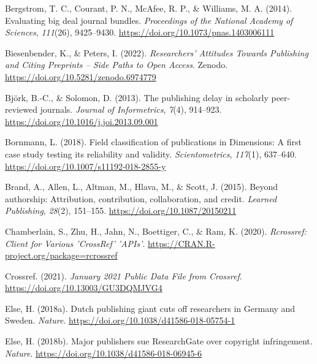 \documentclass[
]{article}
\newlength{\cslhangindent}
\newlength{\cslentryspacingunit} %
\newenvironment{CSLReferences}[2] %
 {%
  \setlength{\parindent}{0pt}
  \ifodd #1
  \let\oldpar\par
  \def\par{\hangindent=\cslhangindent\oldpar}
  \fi
  \setlength{\parskip}{#2\cslentryspacingunit}
 }%
 {}
\begin{document}
\hypertarget{refs}{}
\begin{CSLReferences}{1}{0}
\leavevmode{}%
Bergstrom, T. C., Courant, P. N., McAfee, R. P., \& Williams, M. A. (2014). Evaluating big deal journal bundles. \emph{Proceedings of the National Academy of Sciences}, \emph{111}(26), 9425--9430. \url{https://doi.org/10.1073/pnas.1403006111}

\leavevmode{}%
Biesenbender, K., \& Peters, I. (2022). \emph{{Researchers' Attitudes Towards Publishing and Citing Preprints -- Side Paths to Open Access}}. Zenodo. \url{https://doi.org/10.5281/zenodo.6974779}

\leavevmode{}%
Björk, B.-C., \& Solomon, D. (2013). The publishing delay in scholarly peer-reviewed journals. \emph{Journal of Informetrics}, \emph{7}(4), 914--923. \url{https://doi.org/10.1016/j.joi.2013.09.001}

\leavevmode{}%
Bornmann, L. (2018). Field classification of publications in {Dimensions}: A first case study testing its reliability and validity. \emph{Scientometrics}, \emph{117}(1), 637--640. \url{https://doi.org/10.1007/s11192-018-2855-y}

\leavevmode{}%
Brand, A., Allen, L., Altman, M., Hlava, M., \& Scott, J. (2015). Beyond authorship: Attribution, contribution, collaboration, and credit. \emph{Learned Publishing}, \emph{28}(2), 151--155. \url{https://doi.org/10.1087/20150211}

\leavevmode{}%
Chamberlain, S., Zhu, H., Jahn, N., Boettiger, C., \& Ram, K. (2020). \emph{Rcrossref: {Client} for {Various} '{CrossRef}' '{APIs}'}. \url{https://CRAN.R-project.org/package=rcrossref}

\leavevmode{}%
Crossref. (2021). \emph{January 2021 {Public} {Data} {File} from {Crossref}}. \url{https://doi.org/10.13003/GU3DQMJVG4}

\leavevmode{}%
Else, H. (2018a). Dutch publishing giant cuts off researchers in {Germany} and {Sweden}. \emph{Nature}. \url{https://doi.org/10.1038/d41586-018-05754-1}

\leavevmode{}%
Else, H. (2018b). Major publishers sue {ResearchGate} over copyright infringement. \emph{Nature}. \url{https://doi.org/10.1038/d41586-018-06945-6}


\end{CSLReferences}
\end{document}
